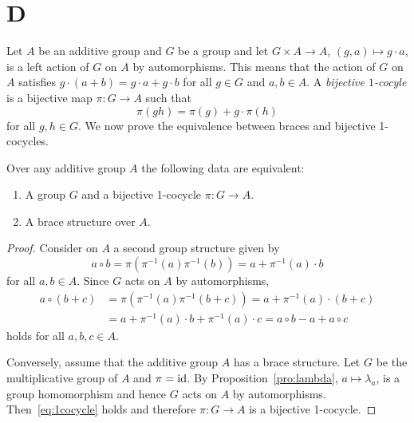 \section*{D}

Let $A$ be an additive group and $G$ be a group and let 
$G\times A\to A$, $(g,a)\mapsto g\cdot a$,
is a left action of $G$ on $A$ by automorphisms. This means that the action of $G$ on $A$ satisfies 
$g\cdot (a+b)=g\cdot a+g\cdot b$ for all $g\in G$ and $a,b\in A$.
A \emph{bijective
$1$-cocyle} is a bijective map $\pi\colon G\to A$ such that 
\begin{equation}
    \label{eq:1cocycle}
    \pi(gh)=\pi(g)+g\cdot \pi(h)
\end{equation}
for all $g,h\in G$. 
We now prove the equivalence between braces and bijective 1-cocycles. 

\begin{theorem}
	\label{thm:1cocycle}
    Over any additive group $A$ the following data are equivalent:
    \begin{enumerate}
        \item A group $G$ and a bijective
            1-cocycle $\pi\colon G\to A$. 
        \item A brace structure over $A$. 
    \end{enumerate}

    \begin{proof}
        Consider on $A$ a second group structure given by 
        \[
		a\circ b=\pi(\pi^{-1}(a)\pi^{-1}(b))=a+\pi^{-1}(a)\cdot b
		\]
		for all
        $a,b\in A$.  Since $G$ acts on $A$ by
        automorphisms, 
        \begin{align*}
            a\circ (b+c)&=\pi(\pi^{-1}(a)\pi^{-1}(b+c))=a+\pi^{-1}(a)\cdot (b+c)\\
            &=a+ \pi^{-1}(a)\cdot b+\pi^{-1}(a)\cdot c
            =a\circ b-a+a\circ c
        \end{align*}
        holds for all $a,b,c\in A$.
        
        Conversely, assume that the additive group $A$ has a brace structure. Let $G$ be the multiplicative group of $A$
        and $\pi=\operatorname{id}$. By
        Proposition~\ref{pro:lambda}, $a\mapsto\lambda_a$, is a group homomorphism and 
        hence $G$ acts on $A$ by automorphisms. Then~\eqref{eq:1cocycle} holds
        and therefore $\pi\colon G\to A$ is a bijective 1-cocycle. 
    \end{proof}
\end{theorem}

